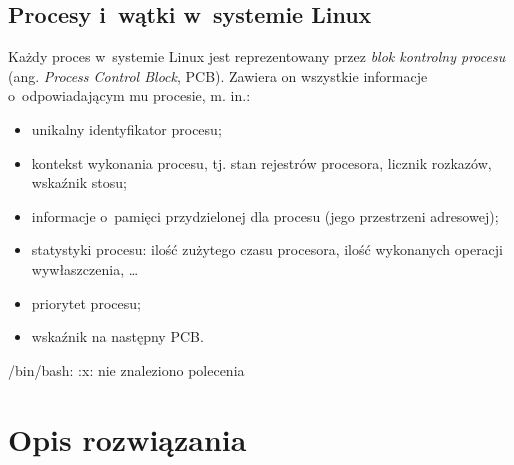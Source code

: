 \documentclass[12pt]{mwart}
\begin{document}
\subsection{Procesy i~wątki w~systemie Linux}
\indent
  Każdy proces w~systemie Linux jest reprezentowany przez \emph{blok kontrolny procesu} (ang. \emph{Process Control Block}, PCB).
  Zawiera on wszystkie informacje o~odpowiadającym mu procesie, m. in.:
  \begin{itemize}
    \item unikalny identyfikator procesu;
    \item kontekst wykonania procesu, tj. stan rejestrów procesora, licznik rozkazów, wskaźnik stosu;
    \item informacje o~pamięci przydzielonej dla procesu (jego przestrzeni adresowej);
    \item statystyki procesu: ilość zużytego czasu procesora, ilość wykonanych operacji wywłaszczenia, \ldots
    \item priorytet procesu;
    \item wskaźnik na następny PCB.
  \end{itemize}
\par
%
/bin/bash: :x: nie znaleziono polecenia
\section{Opis rozwiązania}
\label{sec:solution}
\end{document}
